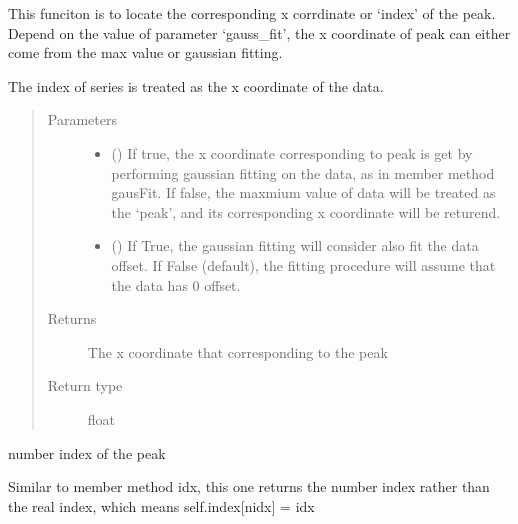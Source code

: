\documentclass[letterpaper,10pt,english]{sphinxmanual}
\begin{document}
\begin{fulllineitems}
\begin{fulllineitems}
This funciton is to locate the corresponding x corrdinate or ‘index’ of
the peak. Depend on the value of parameter ‘gauss\_fit’, the x coordinate
of peak can either come from the max value or gaussian fitting.

The index of series is treated as the x coordinate of the data.
\begin{quote}\begin{description}
\item[{Parameters}] \leavevmode\begin{itemize}
\item {} 
 () \textendash{} If true, the x coordinate corresponding to peak is get by performing
gaussian fitting on the data, as in member method gausFit.
If false, the maxmium value of data will be treated as the ‘peak’,
and its corresponding x coordinate will be returend.

\item {} 
 () \textendash{} If True, the gaussian fitting will consider also fit the data
offset. If False (default), the fitting procedure will assume that
the data has 0 offset.

\end{itemize}

\item[{Returns}] \leavevmode
The x coordinate that corresponding to the peak

\item[{Return type}] \leavevmode
float

\end{description}\end{quote}

\end{fulllineitems}


\begin{fulllineitems}
\label{\detokenize{scibeam.core:scibeam.core.peak.SeriesPeak.nidx}}
number index of the peak

Similar to member method idx, this one returns the number index rather
than the real index, which means self.index{[}nidx{]} = idx

\end{fulllineitems}


\end{fulllineitems}
\end{document}
